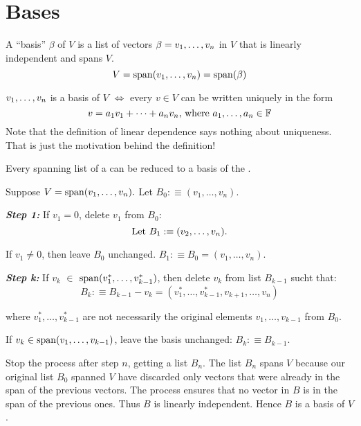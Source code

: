 \section{Bases}


\setcounter{thm}{25}
\begin{mydef} [Basis]
  A ``basis'' $\beta$ of $V$ is a list of vectors $\beta = v_1, \dots, v_n$ in $V$ that is linearly independent and spans $V$.
  \begin{equation}
    V = \operatorname{span} (v_1, \dots, v_n) = \operatorname{span} ( \beta )
  \end{equation}
\end{mydef}

\setcounter{thm}{27}
\begin{thm} 
  $v_1, \dots, v_n$ is a basis of $V$ $\iff$ every $v \in V$ can be written uniquely in the form
  \begin{equation}
    v=a_1 v_1 + \dots + a_n v_n $, where $ a_1, \dots, a_n \in \myF
  \end{equation}
  Note that the definition of linear dependence says nothing about uniqueness. That is just the motivation behind the definition!
\end{thm}

\setcounter{thm}{29}
\begin{thm}  
  \label{thm: every spanning list contains a basis}
  Every spanning list of a \vs can be reduced to a basis of the \vs.
\end{thm}
\begin{prf}
  Suppose $V=\operatorname{span} (v_1, \ldots, v_n).$ Let $B_0 :\equiv (v_1, \ldots, v_n)$.
  
  \emph{\bfseries Step 1: } If $v_1 = 0$, delete $v_1$ from $B_0$: 
  \begin{equation}
    $Let $B_1 :\equiv (v_2, \ldots, v_n).
  \end{equation} 
  
  If $v_1 \neq 0$, then leave $B_0$ unchanged. $B_1 :\equiv B_0=(v_1, \ldots, v_n)$.
  
  \emph{\bfseries Step k: } If $v_k$ $\in$ $\operatorname{span} (v_1^*, \ldots, v_{k-1}^*)$, then delete $v_k$ from list $B_{k-1}$ sucht that:
  \begin{equation}
    B_k :\equiv B_{k-1} - v_k = (v_{1}^*, \ldots, v_{k-1}^*, v_{k+1}, \ldots, v_n)
  \end{equation} 
  
  where $v_1^*, \ldots, v_{k-1}^*$ are not necessarily the original elements $v_1, \ldots, v_{k-1}$ from $B_0$.
  
  If $v_k \in \operatorname{span} (v_1, \ldots, v_{k-1})$, leave the basis unchanged: $B_k :\equiv B_{k-1}$.
  
  Stop the process after step $n$, getting a list $B_n$. The list $B_n$ spans $V$ because our original list $B_0$ spanned $V$  have discarded only vectors that were already in the span of the previous vectors. The process ensures that no vector in $B$ is in the span of the previous ones. Thus $B$ is linearly independent. Hence $B$ is a basis of $V$.
\end{prf}


